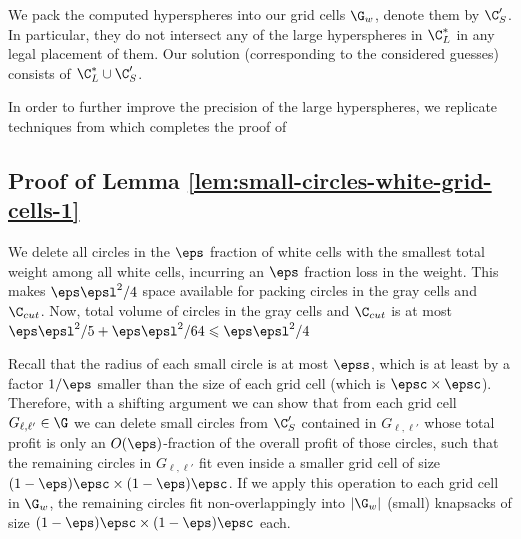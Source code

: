 	
	We pack the computed hyperspheres into our grid cells $\G_w$, denote them by $\C'_S$. In particular, they do not intersect any of the
	large hyperspheres in $\C_{L}^{*}$ in any legal placement of them. Our solution (corresponding to the considered guesses) consists of $\C_{L}^{*}\cup \C'_S$.

In order to further improve the precision of the large hyperspheres, we replicate techniques from  which completes the proof of 


\subsection{Proof of Lemma \ref{lem:small-circles-white-grid-cells-1}}
%
	We delete all circles in the $\eps$ fraction of white cells with the smallest total
	weight among all white cells, incurring an $\eps$ fraction loss in the weight.
	This makes $\eps \epsl^2/4$ space available for packing circles in the gray cells and $\C_{cut}$.
	Now, total volume of circles in the gray cells and $\C_{cut}$ is at most  $\eps \epsl^2/5 + \eps \epsl^2/64 \leqslant \eps \epsl^2/4$

	Recall that the radius of each
	small circle is at most $\epss$, which is at least by a factor
	$1/\eps$ smaller than the size of each grid cell (which is $\epsc \times\epsc$).
	Therefore, with a shifting argument we can show that from each grid
	cell $G_{\ell,\ell'}\in\G$ we can delete small circles from $\C'_S$ contained in
	$G_{\ell,\ell'}$ whose total profit is only an $O(\eps)$-fraction
	of the overall profit of those circles, such
	that the remaining circles in $G_{\ell,\ell'}$ fit even inside a smaller
	grid cell of size $(1-\eps)\epsc \times(1-\eps)\epsc$.
	If we apply this operation to each grid cell in $\G_{w}$, the remaining
	circles fit non-overlappingly into $|\G_{w}|$ (small) knapsacks of
	size $(1-\eps)\epsc \times(1-\eps)\epsc$
	each.

